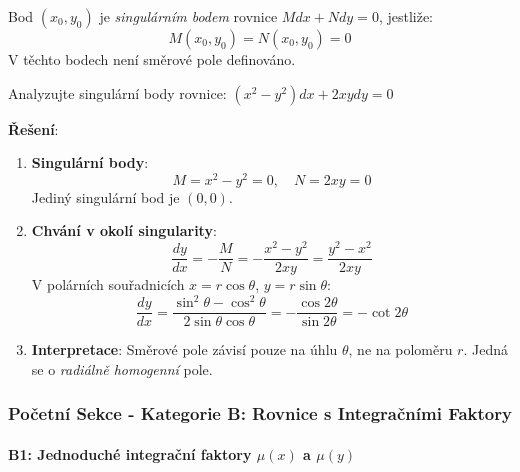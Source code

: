 \vspace{0.8\baselineskip}

\begin{definition}
Bod $(x_0, y_0)$ je \emph{singulárním bodem} rovnice $M dx + N dy = 0$, jestliže:
\[
M(x_0, y_0) = N(x_0, y_0) = 0
\]
V těchto bodech není směrové pole definováno.
\end{definition}

\vspace{0.6\baselineskip}

\begin{example}
Analyzujte singulární body rovnice: $(x^2 - y^2)dx + 2xydy = 0$
\vspace{0.3\baselineskip}

\textbf{Řešení}:
\begin{enumerate}
\item \textbf{Singulární body}: 
\[
M = x^2 - y^2 = 0, \quad N = 2xy = 0
\]
Jediný singulární bod je $(0, 0)$.

\item \textbf{Chvání v okolí singularity}:
\[
\frac{dy}{dx} = -\frac{M}{N} = -\frac{x^2 - y^2}{2xy} = \frac{y^2 - x^2}{2xy}
\]
V polárních souřadnicích $x = r\cos\theta$, $y = r\sin\theta$:
\[
\frac{dy}{dx} = \frac{\sin^2\theta - \cos^2\theta}{2\sin\theta\cos\theta} = -\frac{\cos 2\theta}{\sin 2\theta} = -\cot 2\theta
\]

\item \textbf{Interpretace}: Směrové pole závisí pouze na úhlu $\theta$, ne na poloměru $r$. Jedná se o \emph{radiálně homogenní} pole.
\end{enumerate}
\end{example}

\vspace{0.8\baselineskip}

\subsubsection{Početní Sekce - Kategorie B: Rovnice s Integračními Faktory}
\label{subsubsec:pocetni-kategorie-b}

\paragraph*{B1: Jednoduché integrační faktory $\mu(x)$ a $\mu(y)$}


